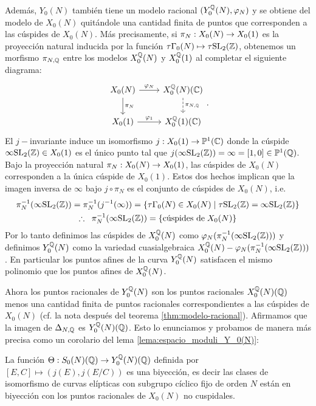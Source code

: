 \documentclass[../../tesis_maestria]{subfiles}
\begin{document}
Además, $Y_0(N)$ también tiene un modelo racional $(Y^{\mathbb{Q}}_0(N),\varphi_N)$ y se obtiene del modelo de $X_0(N)$ quitándole una cantidad finita de puntos que corresponden a las cúspides de $X_0(N)$. Más precisamente, si $\pi_N:X_0(N)\rightarrow X_0(1)$ es la proyección natural inducida por la función $\tau\Gamma_0(N)\mapsto\tau\mathrm{SL}_2(\mathbb{Z})$, obtenemos un morfismo $\pi_{N,\mathbb{Q}}$ entre los modelos $X^{\mathbb{Q}}_0(N)$ y $X^{\mathbb{Q}}_0(1)$ al completar el siguiente diagrama:
	\[
		\begin{tikzcd}
			X_0(N) \arrow[d,"\pi_N"] \arrow[r,"\varphi_N"] & X^\QQ_0(N)(\CC) \arrow[d,dashed,"\pi_{N,\QQ}"] \\
			X_0(1) \arrow[r,"\varphi_1"] & X^\QQ_0(1)(\CC)
		\end{tikzcd}.
	\]
El $j-$invariante induce un isomorfismo $j:X_0(1)\rightarrow\mathbb{P}^1(\mathbb{C})$ donde la cúspide $\infty\mathrm{SL}_2(\mathbb{Z})\in X_0(1)$ es el único punto tal que $j(\infty\mathrm{SL}_2(\mathbb{Z}))=\infty=[1,0]\in\mathbb{P}^1(\mathbb{Q})$. Bajo la proyección natural $\pi_N:X_0(N)\rightarrow X_0(1)$, las cúspides de $X_0(N)$ corresponden a la única cúspide de $X_0(1)$. Estos dos hechos implican que la imagen inversa de $\infty$ bajo $j\circ\pi_N$ es el conjunto de cúspides de $X_0(N)$, i.e.
	\begin{gather*}
		\pi_N^{-1}(\infty\mathrm{SL}_2(\mathbb{Z}))=
		\pi_N^{-1}(j^{-1}(\infty))=
		\{\tau\Gamma_0(N)\in X_0(N)\mid \tau\mathrm{SL}_2(\mathbb{Z})=\infty\mathrm{SL}_2(\mathbb{Z})\}\\
		\therefore\;\;\pi_N^{-1}(\infty\mathrm{SL}_2(\mathbb{Z}))= \{\text{cúspides de}\; X_0(N)\}
	\end{gather*}
Por lo tanto definimos las cúspides de $X^{\mathbb{Q}}_0(N)$ como $\varphi_N(\pi_N^{-1}(\infty\mathrm{SL}_2(\mathbb{Z})))$ y definimos $Y^{\mathbb{Q}}_0(N)$ como la variedad cuasialgebraica $X^{\mathbb{Q}}_0(N)-\varphi_N(\pi_N^{-1}(\infty\mathrm{SL}_2(\mathbb{Z})))$. En particular los puntos afines de la curva $Y^{\mathbb{Q}}_0(N)$ satisfacen el mismo polinomio que los puntos afines de $X^{\mathbb{Q}}_0(N)$.

Ahora los puntos racionales de $Y^{\mathbb{Q}}_0(N)$ son los puntos racionales $X^{\mathbb{Q}}_0(N)(\mathbb{Q})$ menos una cantidad finita de puntos racionales correspondientes a las cúspides de $X_0(N)$ (cf. la nota después del teorema \ref{thm:modelo-racional}). Afirmamos que la imagen de $\Delta_{N,\mathbb{Q}} $ es $Y^{\mathbb{Q}}_0(N)(\mathbb{Q})$. Esto lo enunciamos y probamos de manera más precisa como un corolario del lema \ref{lema:espacio_moduli_Y_0(N)}:
 
\begin{cor}\label{cor:clases-curvas-elipticas-puntos-racionales}
	La función $\Theta:S_0(N)(\mathbb{Q})\rightarrow Y^{\mathbb{Q}}_0(N)(\mathbb{Q})$ definida por $[E,C]\mapsto(j(E),j(E/C))$ es una biyección, es decir las clases de isomorfismo de curvas elípticas con subgrupo cíclico fijo de orden $N$ están en biyección con los puntos racionales de $X_0(N)$ no cuspidales.
\end{cor}
\end{document}
